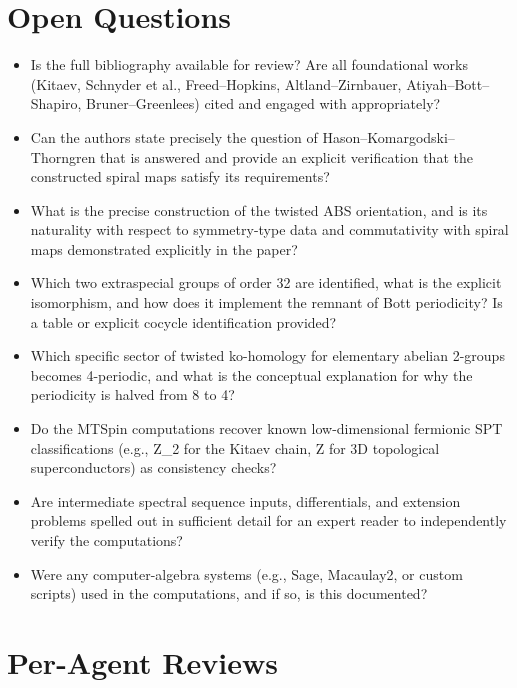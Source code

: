 \documentclass[11pt]{article}
\begin{document}
\section*{Open Questions}
\begin{itemize}[leftmargin=*]
  \item Is the full bibliography available for review? Are all foundational works (Kitaev, Schnyder et al., Freed–Hopkins, Altland–Zirnbauer, Atiyah–Bott–Shapiro, Bruner–Greenlees) cited and engaged with appropriately?
  \item Can the authors state precisely the question of Hason–Komargodski–Thorngren that is answered and provide an explicit verification that the constructed spiral maps satisfy its requirements?
  \item What is the precise construction of the twisted ABS orientation, and is its naturality with respect to symmetry-type data and commutativity with spiral maps demonstrated explicitly in the paper?
  \item Which two extraspecial groups of order 32 are identified, what is the explicit isomorphism, and how does it implement the remnant of Bott periodicity? Is a table or explicit cocycle identification provided?
  \item Which specific sector of twisted ko-homology for elementary abelian 2-groups becomes 4-periodic, and what is the conceptual explanation for why the periodicity is halved from 8 to 4?
  \item Do the MTSpin computations recover known low-dimensional fermionic SPT classifications (e.g., Z\_2 for the Kitaev chain, Z for 3D topological superconductors) as consistency checks?
  \item Are intermediate spectral sequence inputs, differentials, and extension problems spelled out in sufficient detail for an expert reader to independently verify the computations?
  \item Were any computer-algebra systems (e.g., Sage, Macaulay2, or custom scripts) used in the computations, and if so, is this documented?
\end{itemize}

\section*{Per-Agent Reviews}
\end{document}
